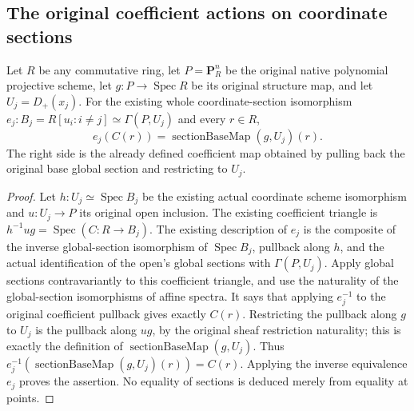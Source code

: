 \subsection{The original coefficient actions on coordinate sections}

\begin{lemma}\label{lem:original-native-coordinate-coefficients}
\leanok
{}
Let $R$ be any commutative ring, let $P=\mathbf P^n_R$ be the original
native polynomial projective scheme, let $g:P\to\operatorname{Spec}R$
be its original structure map, and let $U_j=D_+(x_j)$.
For the existing whole coordinate-section isomorphism
$e_j:B_j=R[u_i:i\ne j]\simeq\Gamma(P,U_j)$ and every $r\in R$,
\[
 e_j(C(r))=\operatorname{sectionBaseMap}(g,U_j)(r).
\]
The right side is the already defined coefficient map obtained by pulling
back the original base global section and restricting to $U_j$.
\end{lemma}
\begin{proof}
Let $h:U_j\simeq\operatorname{Spec}B_j$ be the existing actual coordinate
scheme isomorphism and $u:U_j\to P$ its original open inclusion. The
existing coefficient triangle is
$h^{-1}u g=\operatorname{Spec}(C:R\to B_j)$.
The existing description of $e_j$ is the composite of the inverse
global-section isomorphism of $\operatorname{Spec}B_j$, pullback along
$h$, and the actual identification of the open's global sections with
$\Gamma(P,U_j)$. Apply global sections contravariantly to this coefficient
triangle, and use the naturality of the global-section isomorphisms of
affine spectra. It says that applying $e_j^{-1}$ to the original coefficient
pullback gives exactly $C(r)$. Restricting the pullback along $g$ to $U_j$
is the pullback along $u g$, by the original sheaf restriction naturality;
this is exactly the definition of $\operatorname{sectionBaseMap}(g,U_j)$.
Thus $e_j^{-1}(\operatorname{sectionBaseMap}(g,U_j)(r))=C(r)$.
Applying the inverse equivalence $e_j$ proves the assertion. No equality
of sections is deduced merely from equality at points.
\end{proof}

